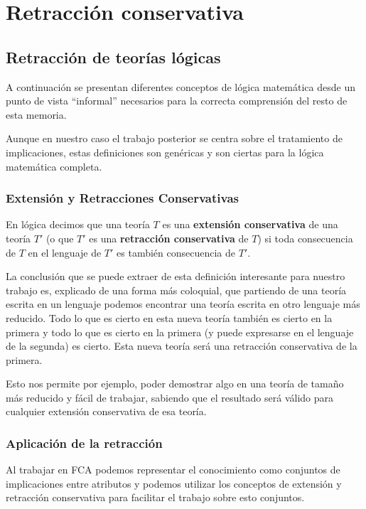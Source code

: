 \chapter*{Retracción conservativa}

	
\section*{Retracción de teorías lógicas}
	
	A continuación se presentan diferentes conceptos de lógica matemática desde un punto de vista ``informal'' necesarios para 
	la correcta comprensión del resto de esta memoria.
	
	Aunque en nuestro caso el trabajo posterior se centra sobre el tratamiento de implicaciones, estas definiciones son genéricas y 
	son ciertas para la lógica matemática completa.
	
	
\subsection*{Extensión y Retracciones Conservativas}
	
	En lógica decimos que una teoría $T$ es una \textbf{extensión conservativa} de una teoría $T'$ (o que $T'$ es una \textbf{retracción conservativa} de $T$) si toda consecuencia de $T$ en el lenguaje de $T'$ es también consecuencia de $T'$.
	
	La conclusión que se puede extraer de esta definición interesante para nuestro trabajo es, explicado de una forma más coloquial, que partiendo de una teoría escrita en un lenguaje podemos encontrar una teoría escrita en otro lenguaje más reducido. Todo lo que es cierto en esta nueva teoría también es cierto en la primera y todo lo que es cierto en la primera (y puede expresarse en el lenguaje de la segunda) es cierto. Esta nueva teoría será una retracción conservativa de la primera.
	
	Esto nos permite por ejemplo, poder demostrar algo en una teoría de tamaño más reducido y fácil de trabajar, sabiendo que el resultado será válido para cualquier extensión conservativa de esa teoría.
	
	
\subsection*{Aplicación de la retracción}
	
	Al trabajar en FCA podemos representar el conocimiento como conjuntos de implicaciones entre atributos y podemos utilizar los conceptos de extensión y retracción conservativa para facilitar el trabajo sobre esto conjuntos.
	
